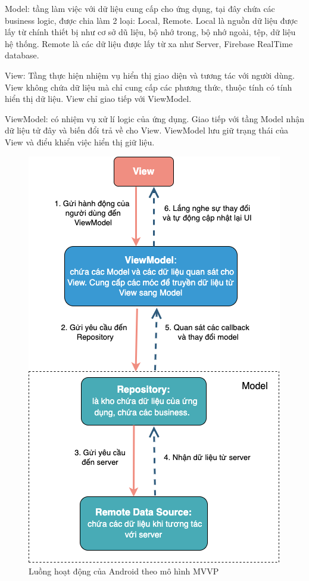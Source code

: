 \documentclass[../Main.tex]{subfiles}
\begin{document}
Model: tầng làm việc với dữ liệu cung cấp cho ứng dụng, tại đây chứa các business logic, được chia làm 2 loại: Local, Remote. Local là nguồn dữ liệu được lấy từ chính thiết bị như cơ sở dũ liệu, bộ nhớ trong, bộ nhớ ngoài, tệp, dữ liệu hệ thống. Remote là các dữ liệu được lấy từ xa như Server, Firebase RealTime database. 

View: Tầng thực hiện nhiệm vụ hiển thị giao diện và tương tác với người dùng. View không chứa dữ liệu mà chỉ cung cấp các phương thức, thuộc tính có tính hiển thị dữ liệu. View chỉ giao tiếp với ViewModel.

ViewModel: có nhiệm vụ xử lí logic của ứng dụng. Giao tiếp với tầng Model nhận dữ liệu tử đây và biến đổi trả về cho View. ViewModel lưu giữ trạng thái của View và điểu khiển việc hiển thị giữ liệu. 

\begin{figure}[H]
    \centering
    \includegraphics[width=0.75\linewidth]{Figure/android_architechture.png}
    \caption{Luồng hoạt động của Android theo mô hình MVVP}
    \label{fig:use_case_tổng_quan}
\end{figure} \newpage
\end{document}

